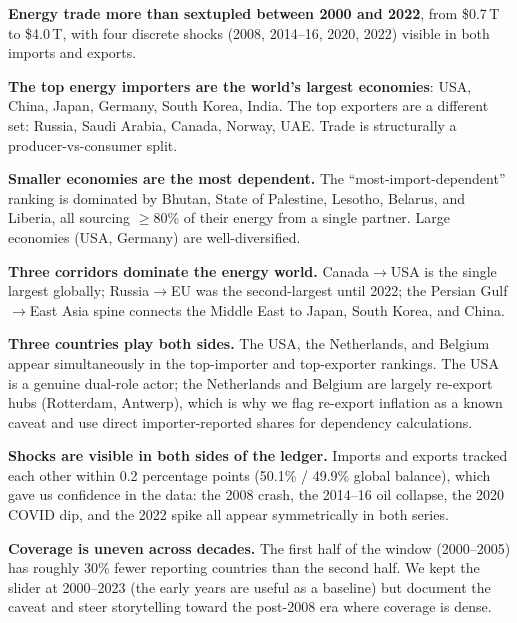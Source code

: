 \documentclass[a4paper,10pt]{article}
\begin{document}
\begin{finding}
\textbf{Energy trade more than sextupled between 2000 and 2022}, from
\$0.7\,T to \$4.0\,T, with four discrete shocks (2008, 2014--16, 2020, 2022)
visible in both imports and exports.
\end{finding}
\begin{finding}
\textbf{The top energy importers are the world's largest economies}: USA,
China, Japan, Germany, South Korea, India. The top exporters are a different
set: Russia, Saudi Arabia, Canada, Norway, UAE. Trade is structurally a
producer-vs-consumer split.
\end{finding}
\begin{finding}
\textbf{Smaller economies are the most dependent.} The ``most-import-dependent''
ranking is dominated by Bhutan, State of Palestine, Lesotho, Belarus, and
Liberia, all sourcing $\geq 80$\% of their energy from a single partner. Large
economies (USA, Germany) are well-diversified.
\end{finding}
\begin{finding}
\textbf{Three corridors dominate the energy world.} Canada$\rightarrow$USA is
the single largest globally; Russia$\rightarrow$EU was the second-largest until
2022; the Persian Gulf$\rightarrow$East Asia spine connects the Middle East to
Japan, South Korea, and China.
\end{finding}
\begin{finding}
\textbf{Three countries play both sides.} The USA, the Netherlands, and Belgium
appear simultaneously in the top-importer and top-exporter rankings. The USA
is a genuine dual-role actor; the Netherlands and Belgium are largely re-export
hubs (Rotterdam, Antwerp), which is why we flag re-export inflation as a known
caveat and use direct importer-reported shares for dependency calculations.
\end{finding}
\begin{finding}
\textbf{Shocks are visible in both sides of the ledger.}
Imports and exports tracked each other within 0.2 percentage points
(50.1\% / 49.9\% global balance), which gave us confidence in the data: the
2008 crash, the 2014--16 oil collapse, the 2020 COVID dip, and the 2022 spike
all appear symmetrically in both series.
\end{finding}
\begin{finding}
\textbf{Coverage is uneven across decades.}
The first half of the window (2000--2005) has roughly 30\% fewer reporting
countries than the second half. We kept the slider at 2000--2023 (the early
years are useful as a baseline) but document the caveat and steer
storytelling toward the post-2008 era where coverage is dense.
\end{finding}
\end{document}
